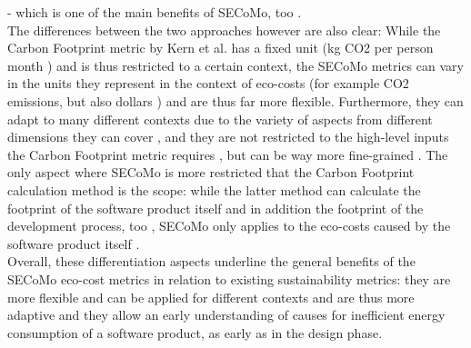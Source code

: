\cite{kern_impacts_2015} - which is one of the main benefits of SECoMo, too \cite{schulze_cost_2016}.\\ %
The differences between the two approaches however are also clear: While the Carbon Footprint metric by Kern et al. has a fixed unit (kg CO2 per person month \cite{kern_impacts_2015}) and is thus restricted to a certain context, the SECoMo metrics can vary in the units they represent in the context of eco-costs (for example CO2 %
 emissions, but also dollars \cite{schulze_cost_2016}) and are thus far more flexible. Furthermore, they can adapt to many different contexts due to the variety of aspects from different dimensions they can cover \cite{schulze_cost_2016}, and they are not restricted to the high-level inputs the Carbon Footprint metric requires \cite{kern_impacts_2015}, but can be way more fine-grained \cite{schulze_cost_2016}. The only aspect where SECoMo is more restricted that the Carbon Footprint calculation method is the scope: while the latter method can calculate the footprint of the software product itself and in addition the footprint of the development process, too \cite{kern_impacts_2015}, SECoMo only applies to the eco-costs caused by the software product itself \cite{schulze_cost_2016}. %
\\ Overall, these differentiation aspects underline the general benefits of the SECoMo eco-cost metrics in relation to existing sustainability metrics: they are more flexible and can be applied for different contexts and are  thus more adaptive and they allow an early understanding of causes for inefficient energy consumption of a software product, as early as in the design phase. %


